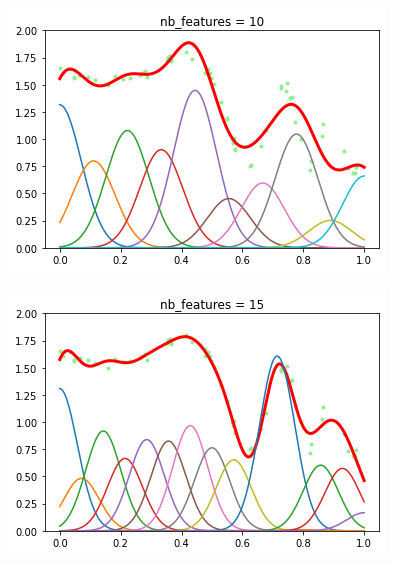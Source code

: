 \documentclass[french,12pt]{article}
\begin{document}
\begin{figure}[ht]
\centering
\begin{minipage}{.45\textwidth}
	\centering
	\includegraphics[width=\textwidth]{overfitting_10.png}
	\label{fig:overfitting_10}
\end{minipage}
\hfill
\begin{minipage}{.45\textwidth}
	\centering
	\includegraphics[width=\textwidth]{overfitting_15.png}
	\label{fig:overfitting_15}
\end{minipage}
\begin{minipage}{.45\textwidth}

\end{minipage}
\end{figure}
\end{document}
